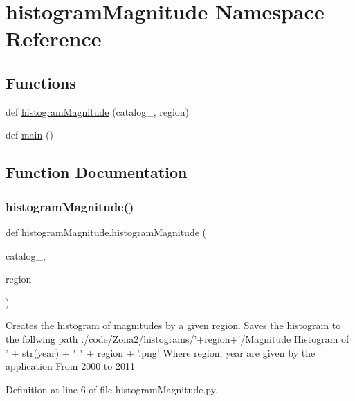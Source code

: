 \hypertarget{namespacehistogram_magnitude}{}\section{histogram\+Magnitude Namespace Reference}
\label{namespacehistogram_magnitude}
\subsection*{Functions}
\begin{DoxyCompactItemize}
\item 
def \hyperlink{namespacehistogram_magnitude_ad4b56f189b5fb0619dc9deed25cdee8f}{histogram\+Magnitude} (catalog\+\_\+, region)
\item 
def \hyperlink{namespacehistogram_magnitude_aba686c56649e979a73ebcd750aeebdd4}{main} ()
\end{DoxyCompactItemize}


\subsection{Function Documentation}
\mbox{\label{namespacehistogram_magnitude_ad4b56f189b5fb0619dc9deed25cdee8f}} 
\subsubsection{\texorpdfstring{histogram\+Magnitude()}{histogramMagnitude()}}
{\footnotesize\ttfamily def histogram\+Magnitude.\+histogram\+Magnitude (\begin{DoxyParamCaption}\item[{}]{catalog\+\_\+,  }\item[{}]{region }\end{DoxyParamCaption})}

\begin{DoxyVerb}Creates the histogram of magnitudes by a given region.
Saves the histogram to the follwing path ./code/Zona2/histograms/'+region+'/Magnitude Histogram of ' + str(year) + " " + region + '.png'
Where region, year are given by the application
From 2000 to 2011
\end{DoxyVerb}
 

Definition at line 6 of file histogram\+Magnitude.\+py.

